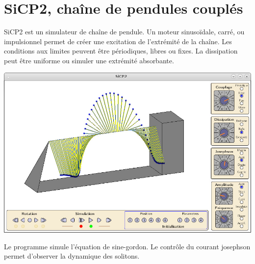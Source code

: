 %
\section{SiCP2, chaîne de pendules couplés}
%
SiCP2 est un simulateur de chaîne de pendule. Un moteur sinusoïdale, carré, ou impulsionnel permet de créer une excitation de l'extrémité de la chaîne. Les conditions aux limites peuvent être périodiques, libres ou fixes. La dissipation peut être uniforme ou simuler une extrémité absorbante.
%
\begin{center}
\includegraphics[scale=0.41]{./illustration/SiCP2}
\end{center}
%
Le programme simule l'équation de sine-gordon. Le contrôle du courant josephson permet d'observer la dynamique des solitons.
%
